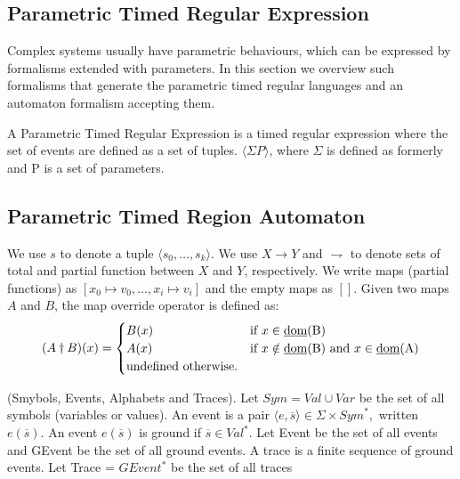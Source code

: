 			
		\subsection{Parametric Timed Regular Expression}
			Complex systems usually have parametric behaviours, which can be expressed by formalisms extended with parameters. In this section we overview such formalisms
			that generate the parametric timed regular languages and an automaton formalism accepting them.
			
			\begin{dfn}
			A Parametric Timed Regular Expression is a timed regular expression where the set of events are defined as a set of tuples. $\langle \Sigma P \rangle$,
			where $\Sigma$ is defined as formerly and P is a set of parameters.
			\end{dfn}
		
			\subsection{Parametric Timed Region Automaton}
				
				
				We use $s$ to denote a tuple $\langle s_0,\dots,s_k \rangle$. We use $X \rightarrow Y$ and $\rightharpoondown$ to denote sets of total and partial function between
				$X$ and $Y$, respectively. We write maps (partial functions) as $[x_0 \mapsto v_0,\dots,x_i \mapsto v_i]$ and the empty maps as $[]$. Given two maps $A$ and $B$,
				the map override operator is defined as:
					\[
					 (A \dagger B)(x) = 
					  \begin{cases} 
					   B(x) & \text{if } x \in \text{\underline{dom}(B)} \\
					   A(x) & \text{if } x \notin \text{\underline{dom}(B)} \text{ and } x \in \text{\underline{dom}(A)} \\
					   \text{undefined otherwise.}
					  \end{cases}
					\]
				
				\begin{dfn}
					(Smybols, Events, Alphabets and Traces).
					Let $\mathit{Sym} = \mathit{Val} \cup \mathit{Var}$ be the set of all symbols (variables or values).
					An event is a pair $\langle e, \overline{s} \rangle \in \Sigma \times \mathit{Sym}^\ast,$ written $e(\overline{s})$.
					An event $e(\overline{s})$ is ground if $\overline{s} \in \mathit{Val}^\ast$.
					Let Event be the set of all events and GEvent be the set of all ground events.
					A trace is a finite sequence of ground events.
					Let Trace = $GEvent^\ast$ be the set of all traces
				\end{dfn}
				

